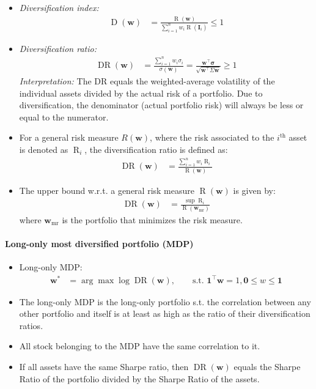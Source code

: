 \documentclass[a4paper,landscape,8pt,fleqn]{scrartcl}
\DeclareMathOperator{\R}{R}						%
\DeclareMathOperator{\D}{D}						%
\DeclareMathOperator{\DR}{DR}					%
\begin{document}
\begin{multicols*}{3}
\begin{itemize}
\item \textit{Diversification index:}
\begin{align*}
\D(\bm w) &= \frac{\R(\bm w)}{\sum_{i=1}^n w_i \R(\bm I_i)} \leq 1
\end{align*}
\item \textit{Diversification ratio:}
\begin{align*}
\DR(\bm w) &= \frac{\sum_{i=1}^n w_i \sigma_i}{\sigma(\bm w)} = \frac{\bm w^\top \bm \sigma}{\sqrt{\bm w^\top \Sigma \bm w}} \geq 1
\end{align*}
\textit{Interpretation:} The DR equals the weighted-average volatility of the individual assets divided by the actual risk of a portfolio. Due to diversification, the denominator (actual portfolio risk) will always be less or equal to the numerator.
\item For a general risk measure $R(\bm w)$, where the risk associated to the $i^\text{th}$ asset is denoted as $\R_i$, the diversification ratio is defined as:
\begin{align*}
\DR(\bm w) &= \frac{\sum_{i=1}^n w_i \R_i}{\R(\bm w)}
\end{align*}
\item The upper bound w.r.t. a general risk measure $\R(\bm w)$ is given by:
\begin{align*}
\DR(\bm w) &= \frac{\sup \R_i}{\R(\bm w_\text{mr})}
\end{align*}
where $\bm w_\text{mr}$ is the portfolio that minimizes the risk measure.
\end{itemize}

\paragraph{Long-only most diversified portfolio (MDP)}
\begin{itemize}
\item Long-only MDP:
\begin{align*}
\bm w^\ast &= \arg\max \log \DR(\bm w), \qquad \text{s.t. } \bm 1^\top \bm w = 1, \bm 0 \leq w \leq \bm 1
\end{align*}
\item The long-only MDP is the long-only portfolio s.t. the correlation between any other portfolio and itself is at least as high as the ratio of their diversification ratios.
\item All stock belonging to the MDP have the same correlation to it.
\item If all assets have the same Sharpe ratio, then $\DR(\bm w)$ equals the Sharpe Ratio of the portfolio divided by the Sharpe Ratio of the assets.
\end{itemize}


\end{multicols*}
\end{document}
